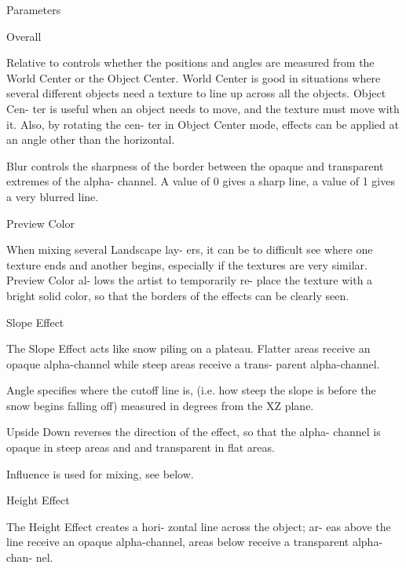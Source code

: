   Parameters



       Overall

       Relative to controls whether the
       positions and angles are measured
       from the World Center or the Object
       Center. World Center is good in
       situations where several different
       objects need a texture to line up
       across all the objects. Object Cen-
       ter is useful when an object needs
       to move, and the texture must move
       with it. Also, by rotating the cen-
       ter in Object Center mode, effects
       can be applied at an angle other
       than the horizontal.

       Blur controls the sharpness of the
       border between the opaque and
       transparent extremes of the alpha-
       channel. A value of 0 gives a sharp
       line, a value of 1 gives a very
       blurred line.



       Preview Color

       When mixing several Landscape lay-
       ers, it can be to difficult see
       where one texture ends and another
       begins, especially if the textures
       are very similar. Preview Color al-
       lows the artist to temporarily re-
       place the texture with a bright
       solid color, so that the borders of
       the effects can be clearly seen.



       Slope Effect

       The Slope Effect acts like snow
       piling on a plateau. Flatter areas
       receive an opaque alpha-channel
       while steep areas receive a trans-
       parent alpha-channel.

       Angle specifies where the cutoff
       line is, (i.e. how steep the slope
       is before the snow begins falling
       off) measured in degrees from the
       XZ plane.

       Upside Down reverses the direction
       of the effect, so that the alpha-
       channel is opaque in steep areas
       and and transparent in flat areas.

       Influence is used for mixing, see
       below.



       Height Effect

       The Height Effect creates a hori-
       zontal line across the object; ar-
       eas above the line receive an
       opaque alpha-channel, areas below
       receive a transparent alpha-chan-
       nel.

